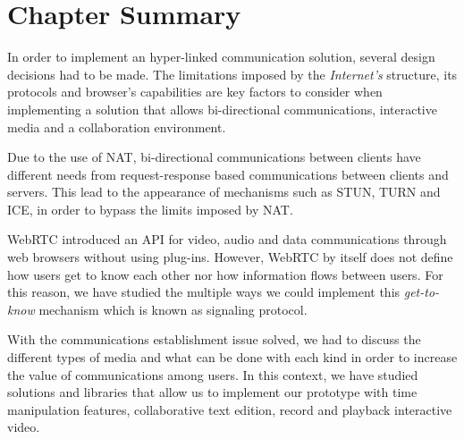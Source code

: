 \section{Chapter Summary}
\label{related:summary}

In order to implement an hyper-linked communication solution, several design decisions had to be made. The limitations imposed by the \emph{Internet's} structure, its protocols and browser's capabilities are key factors to consider when implementing a solution that allows bi-directional communications, interactive media and a collaboration environment.

Due to the use of \ac{NAT}, bi-directional communications between clients have different needs from request-response based communications between clients and servers.
This lead to the appearance of mechanisms such as \ac{STUN}, \ac{TURN} and \ac{ICE}, in order to bypass the limits imposed by \ac{NAT}.

\ac{WebRTC} introduced an \ac{API} for video, audio and data communications through web browsers without using plug-ins.
However, \ac{WebRTC} by itself does not define how users get to know each other nor how information flows between users. For this reason, we have studied the multiple ways we could implement this \emph{get-to-know} mechanism which is known as signaling protocol.

With the communications establishment issue solved, we had to discuss the different types of media and what can be done with each kind in order to increase the value of communications among users. In this context, we have studied solutions and libraries that allow us to implement our prototype with time manipulation features, collaborative text edition, record and playback interactive video. 
